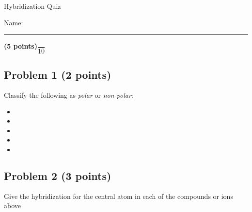 \documentclass[12pt, letterpaper]{memoir}
\begin{document}
	\begin{center}
		{\large Hybridization Quiz}
	\end{center}
	{\large Name: \rule[-1mm]{4in}{.1pt} {\bfseries (5 points)}\hspace{4em}$\dfrac{~}{10}$} 
	
	\subsection*{Problem 1 (2 points)}
	Classify the following as \emph{polar} or \emph{non-polar}:
	
	\begin{itemize}
		\item {}
		\item \vspace{3em} 
		\item \vspace{3em} 
		\item \vspace{3em} 
		\item \vspace{3em} 
	\end{itemize}

	\vspace{2.25em}
	\subsection*{Problem 2 (3 points)}
	Give the hybridization for the central atom in each of the compounds or ions above
\end{document}
